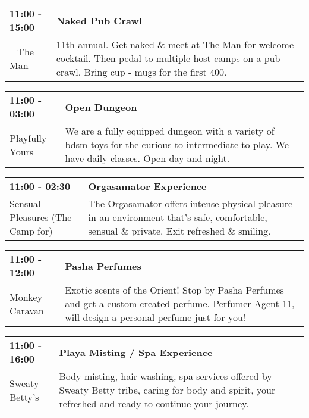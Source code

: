 \begin{tabular}{ p{1in} p{2.2in} }
    \textbf{11:00 - 15:00} & \textbf{Naked Pub Crawl} \\
    ~ \newline The Man & 11th annual.  Get naked \& meet at The Man for welcome cocktail.  Then pedal to multiple host camps on a pub crawl. Bring cup - mugs for the first 400. \\
    \hline 
\end{tabular}
    
\begin{tabular}{ p{1in} p{2.2in} }
    \textbf{11:00 - 03:00} & \textbf{Open Dungeon} \\
    Playfully Yours \newline  & We are a fully equipped dungeon with a variety of bdsm toys for the curious to intermediate to play. We have daily classes. Open day and night. \\
    \hline 
\end{tabular}
    
\begin{tabular}{ p{1in} p{2.2in} }
    \textbf{11:00 - 02:30} & \textbf{Orgasamator Experience} \\
    Sensual Pleasures (The Camp for) \newline  & The Orgasamator offers intense physical pleasure in an environment that's safe, comfortable, sensual \& private.  Exit refreshed \& smiling. \\
    \hline 
\end{tabular}
    
\begin{tabular}{ p{1in} p{2.2in} }
    \textbf{11:00 - 12:00} & \textbf{Pasha Perfumes} \\
    Monkey Caravan \newline  & Exotic scents of the Orient! Stop by Pasha Perfumes and get a custom-created perfume.  Perfumer Agent 11, will design a personal perfume just for you! \\
    \hline 
\end{tabular}
    
\begin{tabular}{ p{1in} p{2.2in} }
    \textbf{11:00 - 16:00} & \textbf{Playa Misting / Spa Experience} \\
    Sweaty  Betty's \newline  & Body misting, hair washing, spa services offered by Sweaty Betty tribe, caring for body and spirit, your refreshed and ready to continue your journey. \\
    \hline 
\end{tabular}
    
